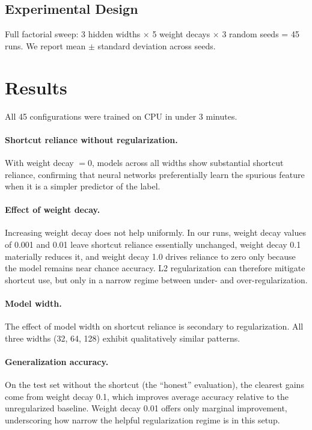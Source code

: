 \documentclass[11pt,a4paper]{article}
\begin{document}
\subsection{Experimental Design}

Full factorial sweep: 3 hidden widths $\times$ 5 weight decays $\times$ 3 random seeds = 45 runs. We report mean $\pm$ standard deviation across seeds.

\section{Results}

All 45 configurations were trained on CPU in under 3 minutes.

\paragraph{Shortcut reliance without regularization.}
With weight decay $= 0$, models across all widths show substantial shortcut reliance, confirming that neural networks preferentially learn the spurious feature when it is a simpler predictor of the label.

\paragraph{Effect of weight decay.}
Increasing weight decay does not help uniformly. In our runs, weight decay values of 0.001 and 0.01 leave shortcut reliance essentially unchanged, weight decay 0.1 materially reduces it, and weight decay 1.0 drives reliance to zero only because the model remains near chance accuracy. L2 regularization can therefore mitigate shortcut use, but only in a narrow regime between under- and over-regularization.

\paragraph{Model width.}
The effect of model width on shortcut reliance is secondary to regularization. All three widths (32, 64, 128) exhibit qualitatively similar patterns.

\paragraph{Generalization accuracy.}
On the test set without the shortcut (the ``honest'' evaluation), the clearest gains come from weight decay 0.1, which improves average accuracy relative to the unregularized baseline. Weight decay 0.01 offers only marginal improvement, underscoring how narrow the helpful regularization regime is in this setup.
\end{document}
